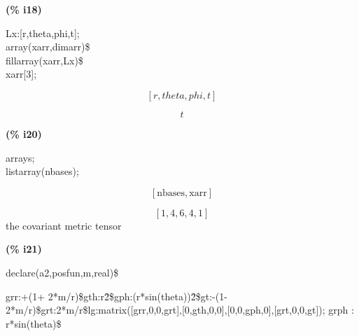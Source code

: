 \documentclass[fleqn]{article}
\begin{document}
\noindent%



\noindent
\begin{minipage}[t]{4.000000em}\color{red}\bfseries
(\% i18)	
\end{minipage}
\begin{minipage}[t]{\textwidth}\color{blue}
Lx:[r,theta,phi,t];\\
array(xarr,dimarr)\$\\
fillarray(xarr,Lx)\$\\
xarr[3];
\end{minipage}
\[\displaystyle \tag{\% o15} 
\left[ r\mathop{,}theta\mathop{,}phi\mathop{,}t\right] \mbox{}\]

\[\tag{\% o18} 
t\mbox{}
\]


\noindent
\begin{minipage}[t]{4.000000em}\color{red}\bfseries
(\% i20)	
\end{minipage}
\begin{minipage}[t]{\textwidth}\color{blue}
arrays;\\
listarray(nbases);
\end{minipage}
\[\displaystyle \tag{\% o19} 
\left[ \ensuremath{\mathrm{nbases}}\mathop{,}\ensuremath{\mathrm{xarr}}\right] \mbox{}\]

\[\tag{\% o20} 
\left[ 1\mathop{,}4\mathop{,}6\mathop{,}4\mathop{,}1\right] \mbox{}
\]
the covariant metric tensor


\noindent
\begin{minipage}[t]{4.000000em}\color{red}\bfseries
(\% i21)	
\end{minipage}
\begin{minipage}[t]{\textwidth}\color{blue}
declare(a2,posfun,m,real)\$
\end{minipage}

\noindent%

grr:+(1+ 2*m/r)\$gth:r\^ 2\$gph:(r*sin(theta))\^ 2\$gt:-(1-2*m/r)\$grt:2*m/r\$lg:matrix([grr,0,0,grt],[0,gth,0,0],[0,0,gph,0],[grt,0,0,gt]);
grph : r*sin(theta)\$
\end{document}
